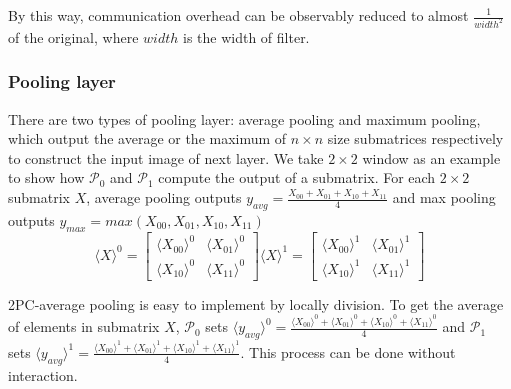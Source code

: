 \documentclass[letterpaper]{article} %
\begin{document}
    By this way, communication overhead can be observably reduced to almost $ \frac{1}{width^{2}} $ of the original, 
    where $width$ is the width of filter. 
    
    
    \subsubsection{Pooling layer}
    
    
    There are two types of pooling layer: average pooling and maximum pooling, 
    which output the average or the maximum of $n\times n$ size submatrices respectively
    to construct the input image of next layer. 
    We take $2\times 2$ window as an example to show how $\mathcal{P}_{0}$ and $\mathcal{P}_{1}$ compute the output of a submatrix.
    For each $2\times 2$ submatrix $X$, average pooling outputs $y_{avg}=\frac{X_{00}+ X_{01}+ X_{10}+  X_{11}}{4}$
    and max pooling outputs $y_{max}=max(X_{00}, X_{01}, X_{10},  X_{11})$
    $$  \langle X\rangle ^{0}= \begin{bmatrix}
        \langle X_{00}\rangle ^{0}& \langle X_{01}\rangle ^{0} \\ 
        \langle X_{10}\rangle ^{0}& \langle X_{11}\rangle ^{0}
       \end{bmatrix}\langle X\rangle ^{1}=\begin{bmatrix}
        \langle X_{00}\rangle ^{1}& \langle X_{01}\rangle ^{1} \\ 
        \langle X_{10}\rangle ^{1}& \langle X_{11}\rangle ^{1}
       \end{bmatrix}$$
    
    
    
    2PC-average pooling is easy to implement by locally division.
    To get the average of elements in submatrix $X$, 
    $\mathcal{P}_{0}$ sets $\langle y_{avg}\rangle^{0} =$$ \frac{\langle X_{00}\rangle ^{0}+ \langle X_{01}\rangle ^{0}+
    \langle X_{10}\rangle ^{0}+ \langle X_{11}\rangle ^{0}}{4}$ and 
    $\mathcal{P}_{1}$ sets $\langle y_{avg}\rangle^{1} = \frac{\langle X_{00}\rangle ^{1}+ \langle X_{01}\rangle ^{1}+
    \langle X_{10}\rangle ^{1}+ \langle X_{11}\rangle ^{1}}{4}$. This process can be done without interaction.
    
\end{document}
